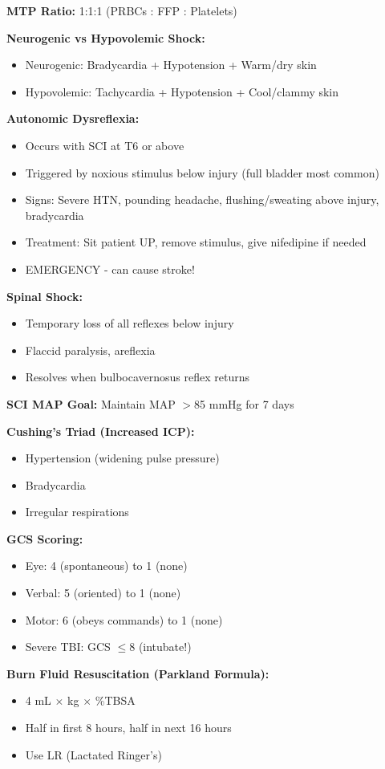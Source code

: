 \documentclass[11pt]{article}
\begin{document}
\begin{tcolorbox}[colback=yellow!10!white,colframe=yellow!75!black,title=MUST KNOW for Exam]
\textbf{MTP Ratio:} 1:1:1 (PRBCs : FFP : Platelets)

\textbf{Neurogenic vs Hypovolemic Shock:}
\begin{itemize}
    \item Neurogenic: Bradycardia + Hypotension + Warm/dry skin
    \item Hypovolemic: Tachycardia + Hypotension + Cool/clammy skin
\end{itemize}

\textbf{Autonomic Dysreflexia:}
\begin{itemize}
    \item Occurs with SCI at T6 or above
    \item Triggered by noxious stimulus below injury (full bladder most common)
    \item Signs: Severe HTN, pounding headache, flushing/sweating above injury, bradycardia
    \item Treatment: Sit patient UP, remove stimulus, give nifedipine if needed
    \item EMERGENCY - can cause stroke!
\end{itemize}

\textbf{Spinal Shock:}
\begin{itemize}
    \item Temporary loss of all reflexes below injury
    \item Flaccid paralysis, areflexia
    \item Resolves when bulbocavernosus reflex returns
\end{itemize}

\textbf{SCI MAP Goal:} Maintain MAP $>$85 mmHg for 7 days

\textbf{Cushing's Triad (Increased ICP):}
\begin{itemize}
    \item Hypertension (widening pulse pressure)
    \item Bradycardia
    \item Irregular respirations
\end{itemize}

\textbf{GCS Scoring:}
\begin{itemize}
    \item Eye: 4 (spontaneous) to 1 (none)
    \item Verbal: 5 (oriented) to 1 (none)
    \item Motor: 6 (obeys commands) to 1 (none)
    \item Severe TBI: GCS $\leq$8 (intubate!)
\end{itemize}

\textbf{Burn Fluid Resuscitation (Parkland Formula):}
\begin{itemize}
    \item 4 mL $\times$ kg $\times$ \%TBSA
    \item Half in first 8 hours, half in next 16 hours
    \item Use LR (Lactated Ringer's)
\end{itemize}

\end{tcolorbox}
\end{document}
